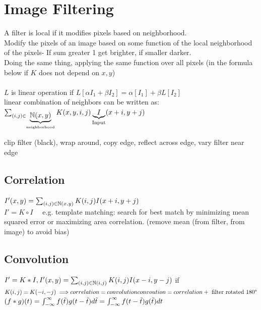 \section{Image Filtering}
 A filter is local if it modifies pixels based on neighborhood.\\
Modify the pixels of an image based on some function of the local neighborhood of the pixels- If sum greater 1 get brighter, if smaller darker.\\
 Doing the same thing, applying the same function over all pixels (in the formula below if $K$ does not depend on $x, y$)\\
\\
$L$ is linear operation if $L[\alpha I_1 + \beta I_2] = \alpha [I_1] + \beta L[I_2]$\\
 linear combination of neighbors can be written as: \\
$\sum_{\begin{subarray}{c}
    (i, j) \in \underbrace{\mathbb{N}(x, y)}_{\text{neighborhood}}
\end{subarray}}
K(x, y, i, j) \underbrace{I}_{\text{Input}} (x + i, y + j)$

 clip filter (black), wrap around, copy edge, reflect across edge, vary filter near edge
\subsection*{Correlation}
$I'(x, y) = \sum_{(i, j) \in \mathbb{N}(x, y)} K(i, j) I (x + i, y + j)$ \\
$I' = K \circ I \quad$ e.g. template matching: search for best match by minimizing mean squared error or maximizing area correlation. (remove mean (from filter, from image) to avoid bias)
\subsection*{Convolution}
$I' = K * I, I'(x, y) = \sum_{(i, j) \in \mathbb{N}(i, j)} K(i, j) I (x - i, y - j)$ if $K(i, j) = K (-i, -j) \implies \\
correlation = convolution \quad\\
convoution = correlation + \text{ filter rotated 180°}$\\
 $(f * g)(t) \\
= \int_{-\infty}^{\infty} f(\tilde{t}) g(t - \tilde{t}) d\tilde{t}\\
= \int_{-\infty}^{\infty} f(t - \tilde{t}) g(\tilde{t}) dt$
